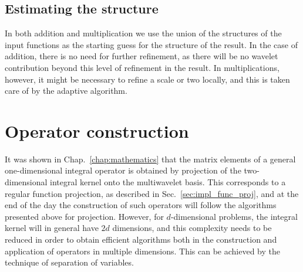 \subsection{Estimating the \tree structure}
In both addition and multiplication we use the union of the \tree structures of
the input functions as the starting guess for the \tree structure of the result.
In the case of addition, there is no need for further refinement, as there will 
be no wavelet contribution beyond this level of refinement in the result. In 
multiplications, however, it might be necessary to refine a scale or two locally,
and this is taken care of by the adaptive algorithm.

\section{Operator construction}
It was shown in Chap.~\ref{chap:mathematics} that the matrix elements of a general
one-dimensional integral operator is obtained by projection of the two-dimensional
integral kernel onto the multiwavelet basis. This corresponds to a regular function
projection, as described in Sec.~\ref{sec:impl_func_proj}, and at the end of the 
day the construction of such operators will follow the algorithms presented above for
projection. However, for $d$-dimensional problems, the integral kernel will in general
have $2d$ dimensions, and this complexity needs to be reduced in order to obtain
efficient algorithms both in the construction and application of operators in multiple
dimensions. This can be achieved by the technique of separation of variables.

